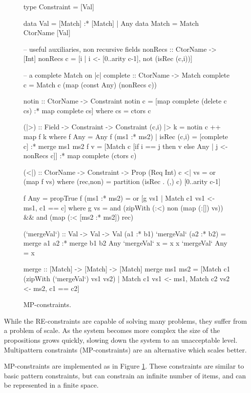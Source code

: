 \documentclass[preprint]{sigplanconf}
\begin{document}
\begin{figure}
\begin{code}
type Constraint = [Val]

data Val    =  [Match] :* [Match]
            |  Any
data Match  =  Match CtorName [Val]

-- useful auxiliaries, non recursive fields
nonRecs :: CtorName -> [Int]
nonRecs c = [i | i <- [0..arity c-1], not (isRec (c,i))]

-- a complete Match on |c|
complete :: CtorName -> Match
complete c = Match c (map (const Any) (nonRecs c))

notin :: CtorName -> Constraint
notin c = [map complete (delete c cs) :* map complete cs]
    where cs = ctors c

(|>) :: Field -> Constraint -> Constraint
(c,i) |> k = notin c ++ map f k
    where
    f Any = Any
    f (ms1 :* ms2) | isRec (c,i) = [complete c] :* merge ms1 ms2
    f v =  [Match c [if i == j then v else Any | j <- nonRecs c]]
           :* map complete (ctors c)

(<|) :: CtorName -> Constraint -> Prop (Req Int)
c <| vs = or (map f vs)
    where
    (rec,non) = partition (isRec . (,) c) [0..arity c-1]

    f Any = propTrue
    f (ms1 :* ms2) = or [g vs1 | Match c1 vs1 <- ms1, c1 == c]
        where g vs =  and (zipWith (:<) non (map (:[]) vs)) &&
                      and (map (:< [ms2 :* ms2]) rec)

(`mergeVal`) :: Val -> Val -> Val
(a1 :* b1) `mergeVal` (a2 :* b2)  = merge a1 a2 :* merge b1 b2
Any        `mergeVal` x           = x
x          `mergeVal` Any         = x

merge :: [Match] -> [Match] -> [Match]
merge  ms1 ms2 = [Match c1 (zipWith (`mergeVal`) vs1 vs2) |
       Match c1 vs1 <- ms1, Match c2 vs2 <- ms2, c1 == c2]
\end{code}
\caption{MP-constraints.}
\label{fig:enumeration}
\end{figure}

While the RE-constraints are capable of solving many problems, they suffer from a problem of scale. As the system becomes more complex the size of the propositions grows quickly, slowing down the system to an unacceptable level. Multipattern constraints (MP-constraints) are an alternative which scales better.

MP-constraints are implemented as in Figure \ref{fig:enumeration}. These constraints are similar to basic pattern constraints, but can constrain an infinite number of items, and can be represented in a finite space.
\end{document}

